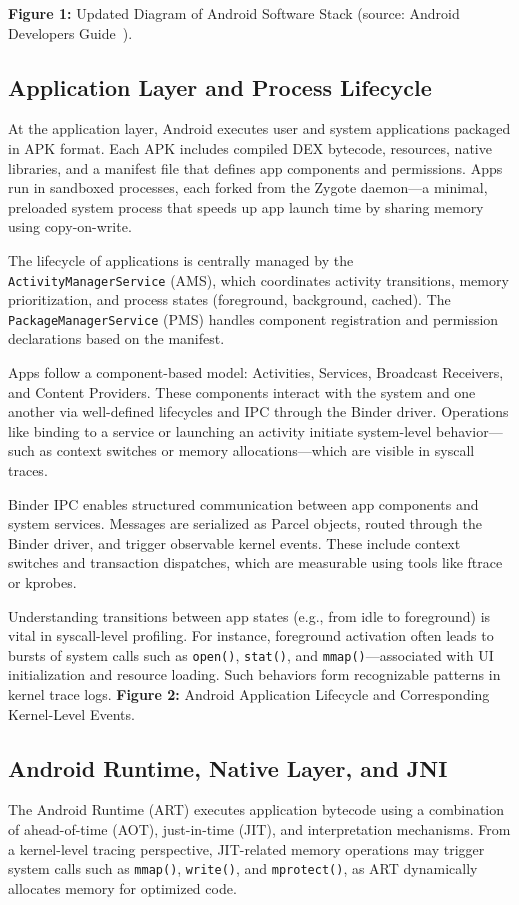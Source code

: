 \documentclass[a4paper,12pt]{report}
\begin{document}
\textbf{Figure 1:} Updated Diagram of Android Software Stack (source: Android Developers Guide~\cite{androidplatformdoc}).


\subsection{Application Layer and Process Lifecycle}
At the application layer, Android executes user and system applications packaged in APK format. Each APK includes compiled DEX bytecode, resources, native libraries, and a manifest file that defines app components and permissions. Apps run in sandboxed processes, each forked from the Zygote daemon—a minimal, preloaded system process that speeds up app launch time by sharing memory using copy-on-write.

The lifecycle of applications is centrally managed by the \texttt{ActivityManagerService} (AMS), which coordinates activity transitions, memory prioritization, and process states (foreground, background, cached). The \texttt{PackageManagerService} (PMS) handles component registration and permission declarations based on the manifest.

Apps follow a component-based model: Activities, Services, Broadcast Receivers, and Content Providers. These components interact with the system and one another via well-defined lifecycles and IPC through the Binder driver. Operations like binding to a service or launching an activity initiate system-level behavior—such as context switches or memory allocations—which are visible in syscall traces.

Binder IPC enables structured communication between app components and system services. Messages are serialized as Parcel objects, routed through the Binder driver, and trigger observable kernel events. These include context switches and transaction dispatches, which are measurable using tools like ftrace or kprobes.

Understanding transitions between app states (e.g., from idle to foreground) is vital in syscall-level profiling. For instance, foreground activation often leads to bursts of system calls such as \texttt{open()}, \texttt{stat()}, and \texttt{mmap()}—associated with UI initialization and resource loading. Such behaviors form recognizable patterns in kernel trace logs.
\textbf{Figure 2:} Android Application Lifecycle and Corresponding Kernel-Level Events.

\subsection{Android Runtime, Native Layer, and JNI}
The Android Runtime (ART) executes application bytecode using a combination of ahead-of-time (AOT), just-in-time (JIT), and interpretation mechanisms. From a kernel-level tracing perspective, JIT-related memory operations may trigger system calls such as \texttt{mmap()}, \texttt{write()}, and \texttt{mprotect()}, as ART dynamically allocates memory for optimized code.
\end{document}
